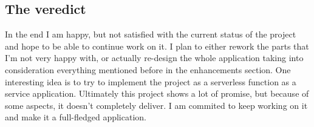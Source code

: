 \documentclass[10pt, a4paper]{article}
\begin{document}
        \subsection{The veredict}
        In the end I am happy, but not satisfied with the current status of the project and hope to be able to continue work on it. I plan to either rework the parts that I'm not very happy with, or actually re-design the whole application taking into consideration everything mentioned before in the enhancements section. One interesting idea is to try to implement the project as a serverless function as a service application.
        Ultimately this project shows a lot of promise, but because of some aspects, it doesn't completely deliver. I am commited to keep working on it and make it a full-fledged application.

        
        

        
\end{document}
